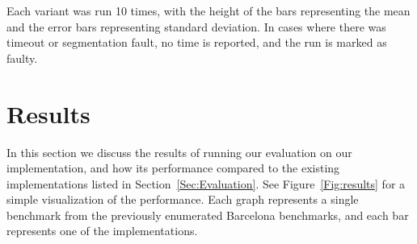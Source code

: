 \documentclass[sigconf]{acmart}
\begin{document}
Each variant was run 10 times, with the height of the bars representing the
mean and the error bars representing standard deviation. In cases where there
was timeout or segmentation fault, no time is reported, and the run is marked
as faulty.

\section{Results} \label{Sec:Results}

In this section we discuss the results of running our evaluation on our
implementation, and how its performance compared to the existing
implementations listed in Section~\ref{Sec:Evaluation}. See
Figure~\ref{Fig:results} for a simple visualization of the performance. Each
graph represents a single benchmark from the previously enumerated Barcelona
benchmarks, and each bar represents one of the implementations. 
\end{document}
